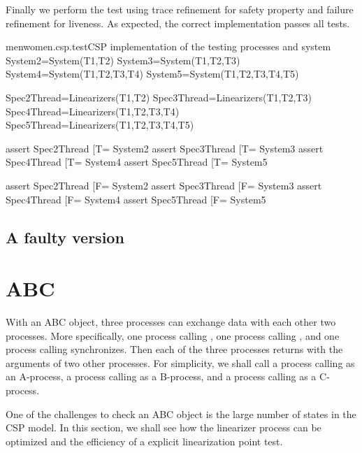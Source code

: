 \documentclass{article}
\begin{document}

Finally we perform the test using trace refinement for safety property and failure refinement for liveness. As expected, the correct implementation passes all tests. 
\begin{cspinline}{menwomen.csp.test}{CSP implementation of the testing processes and system}
System2=System({T1,T2})
System3=System({T1,T2,T3})
System4=System({T1,T2,T3,T4})
System5=System({T1,T2,T3,T4,T5})

Spec2Thread=Linearizers({T1,T2})
Spec3Thread=Linearizers({T1,T2,T3})
Spec4Thread=Linearizers({T1,T2,T3,T4})
Spec5Thread=Linearizers({T1,T2,T3,T4,T5})

assert Spec2Thread [T= System2
assert Spec3Thread [T= System3
assert Spec4Thread [T= System4
assert Spec5Thread [T= System5

assert Spec2Thread [F= System2
assert Spec3Thread [F= System3
assert Spec4Thread [F= System4
assert Spec5Thread [F= System5
\end{cspinline}

\subsection{A faulty version}

\section{ABC}
With an ABC object, three processes can exchange data with each other two processes. More specifically, one process calling , one process calling , and one process calling  synchronizes. Then each of the three processes returns with the arguments of two other processes. For simplicity, we shall call a process calling  as an A-process, a process calling  as a B-process, and a process calling  as a C-process. 

One of the challenges to check an ABC object is the large number of states in the CSP model. In this section, we shall see how the linearizer process can be optimized and the efficiency of a explicit linearization point test.
\end{document}
